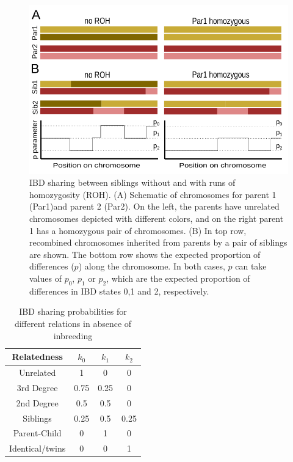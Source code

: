 \documentclass[12pt, letterpaper]{article}
\begin{document}
\begin{figure}[h!]
    \includegraphics[width=18cm]{plots/inkscape_finalImg/schematic_sib_rev.png}
    \centering
    \caption{IBD sharing between siblings without and with runs of homozygosity (ROH). (A) Schematic of chromosomes for parent 1 (Par1)and parent 2 (Par2). On the left, the parents have unrelated chromosomes depicted with different colors, and on the right parent 1 has a homozygous pair of chromosomes. (B) In top row, recombined chromosomes inherited from parents by a pair of siblings are shown. The bottom row shows the expected proportion of differences ($p$) along the chromosome. In both cases, $p$ can take values of $p_0$, $p_1$ or $p_2$, which are the expected proportion of differences in IBD states 0,1 and 2, respectively.  }
    \label{fig0:schematic}
\end{figure}


\begin{table}[h!]
\caption{\label{tab:Table 1}IBD sharing probabilities for different relations in absence of inbreeding}
\begin{tabular}{|c|c|c|c|}
    \hline
    Relatedness & $k_0$ & $k_1$ & $k_2$\\
    \hline
    Unrelated & 1 & 0 & 0\\
    \hline
    3rd Degree & 0.75 & 0.25 & 0\\
    \hline
    2nd Degree & 0.5 & 0.5 & 0\\
    \hline
    Siblings & 0.25 & 0.5 & 0.25\\
    \hline
    Parent-Child & 0 & 1 & 0\\
    \hline
    Identical/twins & 0 & 0 & 1\\
    \hline
\end{tabular}
\label{table1}
\end{table}
\end{document}
